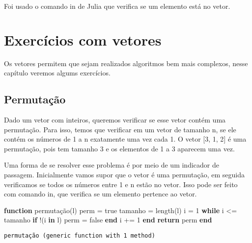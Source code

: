 \documentclass[
  letterpaper,
  DIV=11,
  numbers=noendperiod]{scrreprt}
\newenvironment{Shaded}{\begin{snugshade}}{\end{snugshade}}
\newcommand{\ConstantTok}[1]{\textcolor[rgb]{0.56,0.35,0.01}{#1}}
\newcommand{\ControlFlowTok}[1]{\textcolor[rgb]{0.00,0.23,0.31}{\textbf{#1}}}
\newcommand{\FloatTok}[1]{\textcolor[rgb]{0.68,0.00,0.00}{#1}}
\newcommand{\FunctionTok}[1]{\textcolor[rgb]{0.28,0.35,0.67}{#1}}
\newcommand{\KeywordTok}[1]{\textcolor[rgb]{0.00,0.23,0.31}{\textbf{#1}}}
\newcommand{\NormalTok}[1]{\textcolor[rgb]{0.00,0.23,0.31}{#1}}
\newcommand{\OperatorTok}[1]{\textcolor[rgb]{0.37,0.37,0.37}{#1}}
\begin{document}
Foi usado o comando in de Julia que verifica se um elemento está no
vetor.


\chapter{Exercícios com vetores}\label{exercuxedcios-com-vetores}

Os vetores permitem que sejam realizados algoritmos bem mais complexos,
nesse capítulo veremos algums exercícios.

\section{Permutação}\label{permutauxe7uxe3o}

Dado um vetor com inteiros, queremos verificar se esse vetor contém uma
permutação. Para isso, temos que verificar em um vetor de tamanho n, se
ele contém os números de 1 a n exatamente uma vez cada 1. O vetor {[}3,
1, 2{]} é uma permutação, pois tem tamanho 3 e os elementos de 1 a 3
aparecem uma vez.

Uma forma de se resolver esse problema é por meio de um indicador de
passagem. Inicialmente vamos supor que o vetor é uma permutação, em
seguida verificamos se todos os números entre 1 e n estão no vetor. Isso
pode ser feito com comando in, que verifica se um elemento pertence ao
vetor.

\begin{Shaded}
\begin{Highlighting}[]
\KeywordTok{function} \FunctionTok{permutação}\NormalTok{(l)}
\NormalTok{    perm }\OperatorTok{=} \ConstantTok{true}
\NormalTok{    tamanho }\OperatorTok{=} \FunctionTok{length}\NormalTok{(l)}
\NormalTok{    i }\OperatorTok{=} \FloatTok{1}
    \ControlFlowTok{while}\NormalTok{ i }\OperatorTok{\textless{}=}\NormalTok{ tamanho}
        \ControlFlowTok{if}\NormalTok{ !(i }\KeywordTok{in}\NormalTok{ l)}
\NormalTok{            perm }\OperatorTok{=} \ConstantTok{false}
        \ControlFlowTok{end}    
\NormalTok{        i }\OperatorTok{+=} \FloatTok{1}
    \ControlFlowTok{end}
    \ControlFlowTok{return}\NormalTok{ perm}
\KeywordTok{end}
\end{Highlighting}
\end{Shaded}

\begin{verbatim}
permutação (generic function with 1 method)
\end{verbatim}
\end{document}
